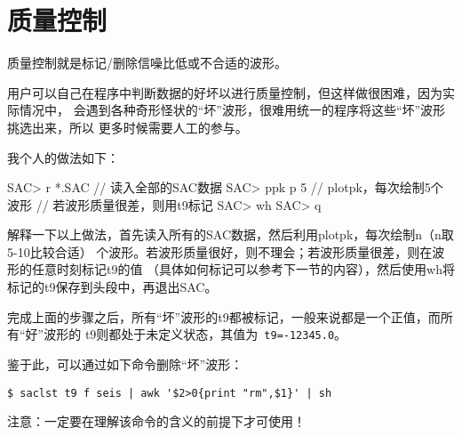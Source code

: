 \section{质量控制}

质量控制就是标记/删除信噪比低或不合适的波形。

用户可以自己在程序中判断数据的好坏以进行质量控制，但这样做很困难，因为实际情况中，
会遇到各种奇形怪状的``坏''波形，很难用统一的程序将这些``坏''波形挑选出来，所以
更多时候需要人工的参与。


我个人的做法如下：
\begin{SACCode}
SAC> r *.SAC        // 读入全部的SAC数据
SAC> ppk p 5        // plotpk，每次绘制5个波形
// 若波形质量很差，则用t9标记
SAC> wh
SAC> q
\end{SACCode}

解释一下以上做法，首先读入所有的SAC数据，然后利用plotpk，每次绘制n（n取5-10比较合适）
个波形。若波形质量很好，则不理会；若波形质量很差，则在波形的任意时刻标记t9的值
（具体如何标记可以参考下一节的内容），然后使用wh将标记的t9保存到头段中，再退出SAC。

完成上面的步骤之后，所有``坏''波形的t9都被标记，一般来说都是一个正值，而所有``好''波形的
t9则都处于未定义状态，其值为~\verb+t9=-12345.0+。

鉴于此，可以通过如下命令删除``坏''波形：
\begin{verbatim}
$ saclst t9 f seis | awk '$2>0{print "rm",$1}' | sh
\end{verbatim}

注意：一定要在理解该命令的含义的前提下才可使用！
